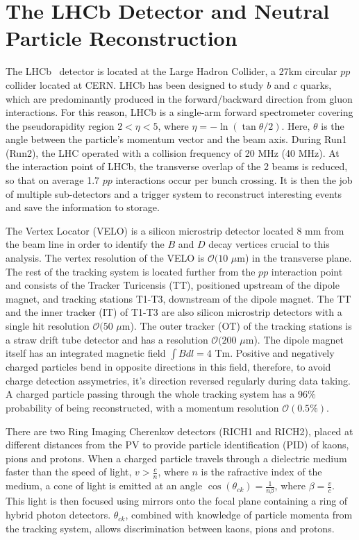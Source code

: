 \documentclass[oneside,12pt]{article}
\begin{document}
\section{The LHCb Detector and Neutral Particle Reconstruction} \label{detector}
The LHCb~\cite{LHCbDetector} detector is located at the Large Hadron Collider, a
27km circular $pp$ collider located at CERN. LHCb has been designed to study $b$
and $c$ quarks, which are predominantly produced in the forward/backward
direction from gluon interactions. For this reason, LHCb is a single-arm forward
spectrometer covering the pseudorapidity region $2 < \eta < 5$, where $\eta =
-\ln (\tan \theta / 2)$. Here, $\theta$ is the angle between the particle's
momentum vector and the beam axis. During Run1 (Run2), the LHC operated with a
collision frequency of 20 MHz (40 MHz). At the interaction point of LHCb, the
transverse overlap of the 2 beams is reduced, so that on average 1.7 $pp$
interactions occur per bunch crossing. It is then the job of multiple
sub-detectors and a trigger system to reconstruct interesting events and save
the information to storage.

The Vertex Locator (VELO) is a silicon microstrip detector located $8$ mm from
the beam line in order to identify the $B$ and $D$ decay vertices crucial to
this analysis. The vertex resolution of the VELO is $\mathcal{O}(10$ $\mu$m) in
the transverse plane. The rest of the tracking system is located further from
the $pp$ interaction point and consists of the Tracker Turicensis (TT),
positioned upstream of the dipole magnet, and tracking stations T1-T3,
downstream of the dipole magnet. The TT and the inner tracker (IT) of T1-T3 are
also silicon microstrip detectors with a single hit resolution $\mathcal{O}(50$
$\mu$m). The outer tracker (OT) of the tracking stations is a straw drift tube
detector and has a resolution $\mathcal{O}(200$ $\mu$m). The dipole magnet
itself has an integrated magnetic field $\int B dl = 4$ Tm.  Positive and
negatively charged particles bend in opposite directions in this field,
therefore, to avoid charge detection assymetries, it's direction reversed
regularly during data taking. A charged particle passing through the whole
tracking system has a 96\% probability of being reconstructed, with a momentum
resolution $\mathcal{O}(0.5\%)$. 

There are two Ring Imaging Cherenkov detectors (RICH1 and RICH2), placed at
different distances from the PV to provide particle identification (PID) of
kaons, pions and protons. When a charged particle travels through a dielectric
medium faster than the speed of light, $v>\frac{c}{n}$, where $n$ is the
rafractive index of the medium, a cone of light is emitted at an angle $\cos
(\theta_{ck})=\frac{1}{n\beta}$, where $\beta=\frac{v}{c}$. This light is then
focused using mirrors onto the focal plane containing a ring of hybrid photon
detectors. $\theta_{ck}$, combined with knowledge of particle momenta from the
tracking system, allows discrimination between kaons, pions and protons.
\end{document}
